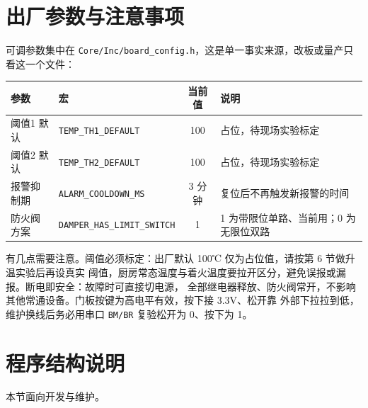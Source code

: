 \documentclass[a4paper,11pt]{ctexart}
\begin{document}
\section{出厂参数与注意事项}\label{sec:params}
可调参数集中在 \texttt{Core/Inc/board\_config.h}，这是单一事实来源，改板或量产只看这一个文件：
\renewcommand{\arraystretch}{1.3}
\begin{center}
\begin{tabular}{|l|l|c|L{5.0cm}|}
\hline
参数 & 宏 & 当前值 & 说明\\
\hline
阈值1 默认 & \texttt{TEMP\_TH1\_DEFAULT} & 100 & 占位，待现场实验标定\\
\hline
阈值2 默认 & \texttt{TEMP\_TH2\_DEFAULT} & 100 & 占位，待现场实验标定\\
\hline
报警抑制期 & \texttt{ALARM\_COOLDOWN\_MS} & 3 分钟 & 复位后不再触发新报警的时间\\
\hline
防火阀方案 & \texttt{DAMPER\_HAS\_LIMIT\_SWITCH} & 1 & 1 为带限位单路、当前用；0 为无限位双路\\
\hline
\end{tabular}
\end{center}
\renewcommand{\arraystretch}{1.0}
有几点需要注意。阈值必须标定：出厂默认 100℃ 仅为占位值，请按第 6 节做升温实验后再设真实
阈值，厨房常态温度与着火温度要拉开区分，避免误报或漏报。断电即安全：故障时可直接切电源，
全部继电器释放、防火阀常开，不影响其他常通设备。门板按键为高电平有效，按下接 3.3V、松开靠
外部下拉拉到低，维护换线后务必用串口 \texttt{BM/BR} 复验松开为 0、按下为 1。

\section{程序结构说明}
本节面向开发与维护。
\end{document}
